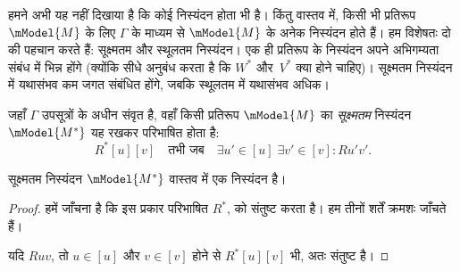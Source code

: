 \documentclass[../../../include/open-logic-section]{subfiles}
\begin{document}


हमने अभी यह नहीं दिखाया है कि कोई निस्यंदन होता भी है। किंतु वास्तव में,
किसी भी प्रतिरूप $\mModel{M}$ के लिए $\Gamma$ के माध्यम से $\mModel{M}$
के अनेक निस्यंदन होते हैं। हम विशेषतः दो की पहचान करते हैं: सूक्ष्मतम और
स्थूलतम निस्यंदन। एक ही प्रतिरूप के निस्यंदन अपने अभिगम्यता संबंध में भिन्न
होंगे (क्योंकि  सीधे अनुबंध करता है कि $W^*$
और~$V^*$ क्या होने चाहिए)। सूक्ष्मतम निस्यंदन में यथासंभव कम जगत संबंधित
होंगे, जबकि स्थूलतम में यथासंभव अधिक।

\begin{defn}
  जहाँ $\Gamma$ उपसूत्रों के अधीन संवृत है, वहाँ किसी प्रतिरूप
  $\mModel{M}$ का \emph{सूक्ष्मतम} निस्यंदन $\mModel{M^*}$ यह रखकर
  परिभाषित होता है:
  \[
  R^*[u][v] \quad \text{तभी जब} \quad \exists u'\in [u] \;
  \exists v' \in [v] : Ru'v'.
  \]
\end{defn}

\begin{prop}
  सूक्ष्मतम निस्यंदन $\mModel{M^*}$ वास्तव में एक निस्यंदन है।
\end{prop}

\begin{proof}
  हमें जाँचना है कि इस प्रकार परिभाषित $R^*$,
   को संतुष्ट
  करता है। हम तीनों शर्तें क्रमशः जाँचते हैं।

  यदि $Ruv$, तो $u \in [u]$ और $v \in [v]$ होने से $R^*[u][v]$ भी,
  अतः  संतुष्ट है।
  
  
\end{proof}
\end{document}
